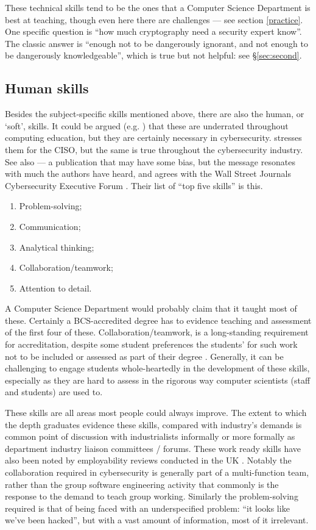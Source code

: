 \documentclass[conference]{IEEEtran}
\begin{document}
\begin{itemize}
These technical skills tend to be the ones that a Computer Science Department is best at teaching, though even here there are challenges --- see section \ref{practice}. One specific question is ``how much cryptography need a security expert know''. The classic answer is ``enough not to be dangerously ignorant, and not enough to be dangerously knowledgeable'', which is true but not helpful: see \S\ref{sec:second}.
\end{itemize}
\subsection{Human skills}\label{sec:human}
Besides the subject-specific skills mentioned above, there are also the human, or `soft', skills. It could be argued (e.g. \cite{Palkar2013a}) that these are underrated throughout computing education, but they are certainly necessary in cybersecurity.
\cite{Froehlich2019a} stresses them for the CISO, but the same is true throughout the cybersecurity industry. See also \cite{InfoSec2019a} ---  a publication that may have some bias, but the message resonates with much the authors have heard, and agrees with the Wall Street Journals Cybersecurity Executive Forum \cite{WallStreetJournal2018c}. Their list of ``top five skills'' is this.
\begin{enumerate}
\item    Problem-solving;
\item    Communication;
\item    Analytical thinking;
\item    Collaboration/teamwork;
\item    Attention to detail.
\end{enumerate}

A Computer Science Department would probably claim that it taught most of these. Certainly a BCS-accredited degree has to evidence teaching and assessment of the first four of these. Collaboration/teamwork, is a long-standing requirement for accreditation, despite some student preferences the students' for such work not to be included or assessed as part of their degree \cite{Cricketal2020a}. Generally, it can be challenging to engage students whole-heartedly in the development of these skills, especially as they are hard to assess in the rigorous way computer scientists (staff and students) are used to. 

These skills are all areas most people could always improve. The extent to which the depth graduates evidence these skills, compared with industry's demands is common point of discussion with industrialists informally or more formally as department industry liaison committees / forums. These work ready skills have also been noted by employability reviews conducted in the UK \cite{shadbolt2016shadbolt,wakeham}. Notably the collaboration required in cybersecurity is generally part of a multi-function team, rather than the group software engineering activity that commonly is the response to the demand to teach group working. Similarly the problem-solving required is that of being faced with an underspecified problem: ``it looks like we've been hacked'', but with a vast amount of information, most of it irrelevant.
\end{document}
